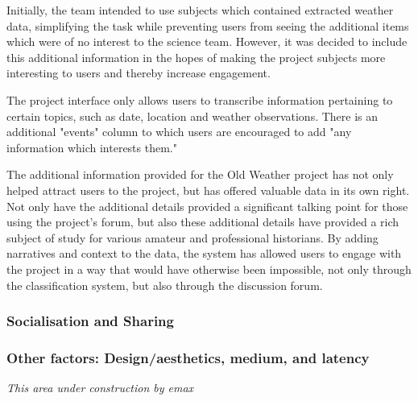 \documentclass{sigchi}
\begin{document}
Initially, the team intended to use subjects which contained extracted weather data, simplifying the task while preventing users from seeing the additional items which were of no interest to the science team. However, it was decided to include this additional information in the hopes of making the project subjects more interesting to users and thereby increase engagement.

The project interface only allows users to transcribe information pertaining to certain topics, such as date, location and weather observations. There is an additional "events" column to which users are encouraged to add "any information which interests them." 


The additional information provided for the Old Weather project has not only helped attract users to the project, but has offered valuable data in its own right. Not only have the additional details provided a significant talking point for those using the project's forum, but also these additional details have provided a rich subject of study for various amateur and professional historians. By adding narratives and context to the data, the system has allowed users to engage with the project in a way that would have otherwise been impossible, not only through the classification system, but also through the discussion forum.


\subsubsection{Socialisation and Sharing}

\subsubsection{Other factors: Design/aesthetics, medium, and latency}

\emph{This area under construction by emax}
\end{document}
